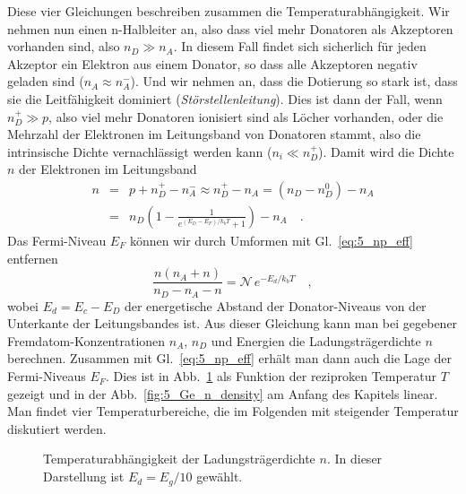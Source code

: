 Diese vier Gleichungen beschreiben zusammen die Temperaturabhängigkeit. Wir nehmen nun  einen n-Halbleiter an, also dass viel mehr Donatoren als Akzeptoren vorhanden sind, also $n_D \gg n_A$. In diesem Fall findet sich sicherlich für jeden Akzeptor ein Elektron aus einem Donator, so dass alle Akzeptoren negativ geladen sind ($n_A \approx n_A^-$).
Und wir nehmen an, dass die Dotierung so stark ist, dass sie die Leitfähigkeit dominiert (\emph{Störstellenleitung}). Dies ist dann der Fall, wenn $n_D^+ \gg p$, also viel mehr Donatoren ionisiert sind als Löcher vorhanden, oder die Mehrzahl der Elektronen im Leitungsband von Donatoren stammt, also die intrinsische Dichte vernachlässigt werden kann ($n_i \ll n_D^+$). Damit wird die Dichte $n$ der Elektronen im Leitungsband
\begin{eqnarray}
    n  &= & p + n_D^+ -  n_A^- \approx n_D^+ -  n_A = (n_D - n_D^0) - n_A \\
    & =& n_D \left( 1- \frac{1}{e^{(E_D - E_F)/ k_b T } +1} \right) - n_A \quad .
\end{eqnarray}
Das Fermi-Niveau $E_F$ können wir durch Umformen mit Gl.~\ref{eq:5_np_eff} entfernen
\begin{equation}
    \frac{n (n_A + n)}{n_D - n_A - n} = \mathcal{N} \, e^{- E_d / k_b T} \quad , \label{eq:5_n_of_T}
\end{equation}
wobei $E_d = E_c - E_D$ der energetische Abstand der Donator-Niveaus von der Unterkante der Leitungsbandes ist. Aus dieser Gleichung kann man bei gegebener Fremdatom-Konzentrationen  $n_A$, $n_D$ und Energien die Ladungsträgerdichte $n$ berechnen. Zusammen mit  
Gl.~\ref{eq:5_np_eff} erhält man dann auch die Lage der Fermi-Niveaus $E_F$. Dies ist in Abb.~\ref{fig:5_dpoing_temp} als Funktion der reziproken Temperatur $T$ gezeigt und in der Abb.~\ref{fig:5_Ge_n_density} am Anfang des Kapitels linear. Man findet vier Temperaturbereiche, die im Folgenden mit steigender Temperatur diskutiert werden.

\begin{figure} 
    \caption{Temperaturabhängigkeit der Ladungsträgerdichte $n$. In dieser Darstellung ist $E_d = E_g / 10$ gewählt. \label{fig:5_dpoing_temp}}
\end{figure}


